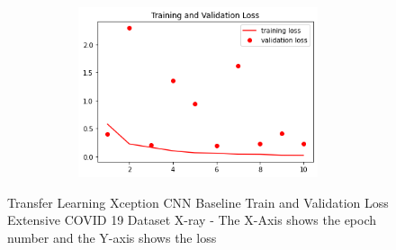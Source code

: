  \begin{figure}[H]
    \centering
    \includegraphics[width=1\textwidth,height=5cm,keepaspectratio]{Images/XceptionBaselineTrainingValidationLossExtensiveCT.png}\\
    \caption{Transfer Learning Xception CNN Baseline Train and Validation Loss Extensive COVID 19 Dataset X-ray - The X-Axis shows the epoch number and the Y-axis shows the loss}
    \label{fig:Xception CNN Baseline Train and Validation Loss Extensive COVID 19 Dataset X-ray}
\end{figure}

